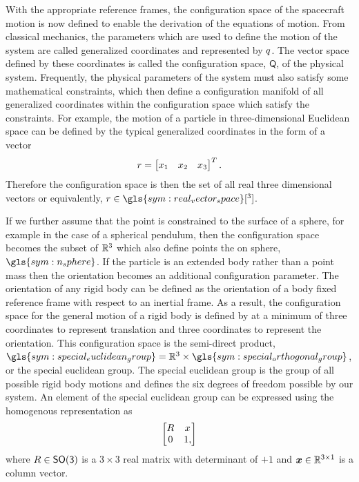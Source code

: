 With the appropriate reference frames, the configuration space of the spacecraft motion is now defined to enable the derivation of the equations of motion.
From classical mechanics, the parameters which are used to define the motion of the system are called generalized coordinates and represented by \( q \).
The vector space defined by these coordinates is called the configuration space, \( \mathsf{Q} \), of the physical system.
Frequently, the physical parameters of the system must also satisfy some mathematical constraints, which then define a configuration manifold of all generalized coordinates within the configuration space which satisfy the constraints.
For example, the motion of a particle in three-dimensional Euclidean space can be defined by the typical generalized coordinates in the form of a vector
\begin{align*}
    r = \begin{bmatrix}
        x_1 & x_2 & x_3
    \end{bmatrix}^T.
\end{align*}
Therefore the configuration space is then the set of all real three dimensional vectors or equivalently, \(\vc{r} \in \gls{sym:real_vector_space}[^3]\).

If we further assume that the point is constrained to the surface of a sphere, for example in the case of a spherical pendulum, then the configuration space becomes the subset of \( \mathbb{R}^3 \) which also define points the on sphere, \( \gls{sym:n_sphere} \).
If the particle is an extended body rather than a point mass then the orientation becomes an additional configuration parameter.
The orientation of any rigid body can be defined as the orientation of a body fixed reference frame with respect to an inertial frame. 
As a result, the configuration space for the general motion of a rigid body is defined by at a minimum of three coordinates to represent translation and three coordinates to represent the orientation.
This configuration space is the semi-direct product, \( \gls{sym:special_euclidean_group} = \R^3 \times \gls{sym:special_orthogonal_group} \), or the special euclidean group.
The special euclidean group is the group of all possible rigid body motions and defines the six degrees of freedom possible by our system.
An element of the special euclidean group can be expressed using the homogenous representation as
\begin{align*}
    \begin{bmatrix}
        R & x \\
        0 & 1,
    \end{bmatrix}
\end{align*}
where \( R \in \mathsf{SO(3)}\) is a \( 3 \times 3 \) real matrix with determinant of \( +1\) and \( \bm{x} \in \mathbb{R}^{3 \times 1}\) is a column vector.

